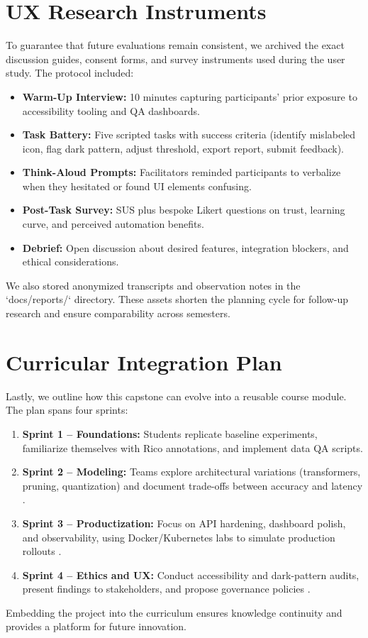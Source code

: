 \documentclass[11pt,a4paper]{report}
\begin{document}
\chapter{UX Research Instruments}
To guarantee that future evaluations remain consistent, we archived the exact discussion guides, consent forms, and survey instruments used during the user study. The protocol included:
\begin{itemize}
    \item \textbf{Warm-Up Interview:} 10 minutes capturing participants' prior exposure to accessibility tooling and QA dashboards.
    \item \textbf{Task Battery:} Five scripted tasks with success criteria (identify mislabeled icon, flag dark pattern, adjust threshold, export report, submit feedback).
    \item \textbf{Think-Aloud Prompts:} Facilitators reminded participants to verbalize when they hesitated or found UI elements confusing.
    \item \textbf{Post-Task Survey:} SUS plus bespoke Likert questions on trust, learning curve, and perceived automation benefits.
    \item \textbf{Debrief:} Open discussion about desired features, integration blockers, and ethical considerations.
\end{itemize}
We also stored anonymized transcripts and observation notes in the `docs/reports/` directory. These assets shorten the planning cycle for follow-up research and ensure comparability across semesters.

\chapter{Curricular Integration Plan}
Lastly, we outline how this capstone can evolve into a reusable course module. The plan spans four sprints:
\begin{enumerate}
    \item \textbf{Sprint 1 -- Foundations:} Students replicate baseline experiments, familiarize themselves with Rico annotations, and implement data QA scripts.
    \item \textbf{Sprint 2 -- Modeling:} Teams explore architectural variations (transformers, pruning, quantization) and document trade-offs between accuracy and latency \cite{vit}\cite{yolov11}.
    \item \textbf{Sprint 3 -- Productization:} Focus on API hardening, dashboard polish, and observability, using Docker/Kubernetes labs to simulate production rollouts \cite{docker}.
    \item \textbf{Sprint 4 -- Ethics and UX:} Conduct accessibility and dark-pattern audits, present findings to stakeholders, and propose governance policies \cite{darkpatterns}\cite{multimodalaccessibility}.
\end{enumerate}
Embedding the project into the curriculum ensures knowledge continuity and provides a platform for future innovation.
\end{document}
